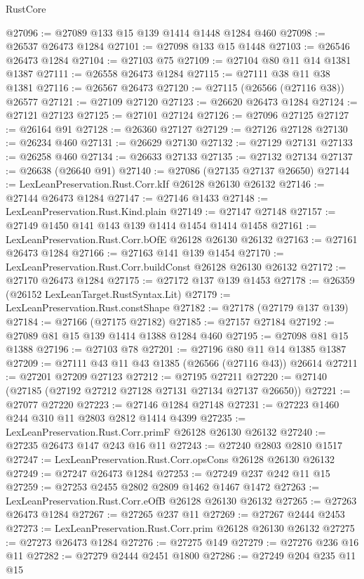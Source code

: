 \begin{lexlean}{RustCore}
\begin{coremodule}
@27096 := @27089 @133 @15 @139 @1414 @1448 @1284 @460
@27098 := @26537 @26473 @1284
@27101 := @27098 @133 @15 @1448
@27103 := @26546 @26473 @1284
@27104 := @27103 @75
@27109 := @27104 @80 @11 @14 @1381 @1387
@27111 := @26558 @26473 @1284
@27115 := @27111 @38 @11 @38 @1381
@27116 := @26567 @26473
@27120 := @27115 (@26566 (@27116 @38)) @26577
@27121 := @27109 @27120
@27123 := @26620 @26473 @1284
@27124 := @27121 @27123
@27125 := @27101 @27124
@27126 := @27096 @27125
@27127 := @26164 @91
@27128 := @26360 @27127
@27129 := @27126 @27128
@27130 := @26234 @460
@27131 := @26629 @27130
@27132 := @27129 @27131
@27133 := @26258 @460
@27134 := @26633 @27133
@27135 := @27132 @27134
@27137 := @26638 (@26640 @91)
@27140 := @27086 (@27135 @27137 @26650)
@27144 := LexLeanPreservation.Rust.Corr.kIf @26128 @26130 @26132
@27146 := @27144 @26473 @1284
@27147 := @27146 @1433
@27148 := LexLeanPreservation.Rust.Kind.plain
@27149 := @27147 @27148
@27157 := @27149 @1450 @141 @143 @139 @1414 @1454 @1414 @1458
@27161 := LexLeanPreservation.Rust.Corr.bOfE @26128 @26130 @26132
@27163 := @27161 @26473 @1284
@27166 := @27163 @141 @139 @1454
@27170 := LexLeanPreservation.Rust.Corr.buildConst @26128 @26130 @26132
@27172 := @27170 @26473 @1284
@27175 := @27172 @137 @139 @1453
@27178 := @26359 (@26152 LexLeanTarget.RustSyntax.Lit)
@27179 := LexLeanPreservation.Rust.constShape
@27182 := @27178 (@27179 @137 @139)
@27184 := @27166 (@27175 @27182)
@27185 := @27157 @27184
@27192 := @27089 @81 @15 @139 @1414 @1388 @1284 @460
@27195 := @27098 @81 @15 @1388
@27196 := @27103 @78
@27201 := @27196 @80 @11 @14 @1385 @1387
@27209 := @27111 @43 @11 @43 @1385 (@26566 (@27116 @43)) @26614
@27211 := @27201 @27209 @27123
@27212 := @27195 @27211
@27220 := @27140 (@27185 (@27192 @27212 @27128 @27131 @27134 @27137 @26650))
@27221 := @27077 @27220
@27223 := @27146 @1284 @27148
@27231 := @27223 @1460 @244 @310 @11 @2803 @2812 @1414 @4399
@27235 := LexLeanPreservation.Rust.Corr.primF @26128 @26130 @26132
@27240 := @27235 @26473 @147 @243 @16 @11
@27243 := @27240 @2803 @2810 @1517
@27247 := LexLeanPreservation.Rust.Corr.opsCons @26128 @26130 @26132
@27249 := @27247 @26473 @1284
@27253 := @27249 @237 @242 @11 @15
@27259 := @27253 @2455 @2802 @2809 @1462 @1467 @1472
@27263 := LexLeanPreservation.Rust.Corr.eOfB @26128 @26130 @26132
@27265 := @27263 @26473 @1284
@27267 := @27265 @237 @11
@27269 := @27267 @2444 @2453
@27273 := LexLeanPreservation.Rust.Corr.prim @26128 @26130 @26132
@27275 := @27273 @26473 @1284
@27276 := @27275 @149
@27279 := @27276 @236 @16 @11
@27282 := @27279 @2444 @2451 @1800
@27286 := @27249 @204 @235 @11 @15

\end{coremodule}
\end{lexlean}

